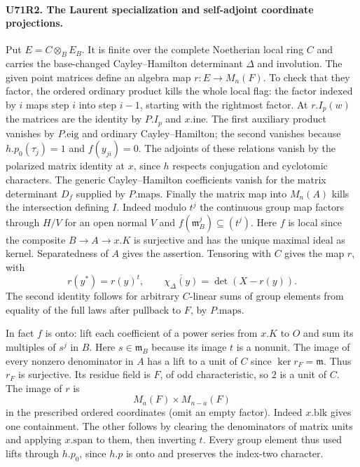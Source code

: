 \paragraph{U71R2. The Laurent specialization and self-adjoint coordinate projections.}
Put $E=C\otimes_B E_B$. It is finite over the complete
Noetherian local ring $C$ and carries the base-changed
Cayley--Hamilton determinant $\Delta$ and involution.
The given point matrices define an algebra map
$r:E\to M_n(F)$. To check that they factor, the ordered ordinary
product kills the whole local flag: the factor indexed by $i$
maps step $i$ into step $i-1$, starting with the rightmost
factor. At $r.I_p(w)$ the matrices are the identity by $P.I_p$
and $x.\mathrm{ine}$. The first auxiliary product vanishes by
$P.\mathrm{eig}$ and ordinary Cayley--Hamilton; the second
vanishes because $h.p_0(\tau_j)=1$ and $f(y_{ji})=0$.
The adjoints of these relations vanish by the polarized matrix
identity at $x$, since $h$ respects conjugation and cyclotomic
characters. The generic Cayley--Hamilton coefficients vanish for
the matrix determinant $D_f$ supplied by $P.\mathrm{maps}$.
Finally the matrix map into $M_n(A)$ kills the intersection
defining $I$. Indeed modulo $t^j$ the continuous group map
factors through $H/V$ for an open normal $V$ and
$f(\mathfrak m_B^j)\subseteq(t^j)$. Here $f$ is local since
the composite $B\to A\to x.K$ is surjective and has the unique
maximal ideal as kernel. Separatedness of $A$ gives the assertion.
Tensoring with $C$ gives the map $r$, with
\[
 r(y^*)=r(y)^t,\qquad
 \overline{\chi_\Delta(y)}=\det(X-r(y)).
\]
The second identity follows for arbitrary $C$-linear sums of
group elements from equality of the full laws after pullback
to $F$, by $P.\mathrm{maps}$.

In fact $f$ is onto: lift each coefficient of a power series
from $x.K$ to $O$ and sum its multiples of $s^j$ in $B$.
Here $s\in\mathfrak m_B$ because its image $t$ is a nonunit.
The image of every nonzero denominator in $A$ has a lift to
a unit of $C$ since $\ker r_F=\mathfrak m$.
Thus $r_F$ is surjective. Its residue field is $F$, of odd
characteristic, so $2$ is a unit of $C$.
The image of $r$ is
\[
 M_a(F)\times M_{n-a}(F)
\]
in the prescribed ordered coordinates (omit an empty factor).
Indeed $x.\mathrm{blk}$ gives one containment. The other follows
by clearing the denominators of matrix units and applying
$x.\mathrm{span}$ to them, then inverting $t$. Every group element
thus used lifts through $h.p_0$, since $h.p$ is onto and preserves
the index-two character.


